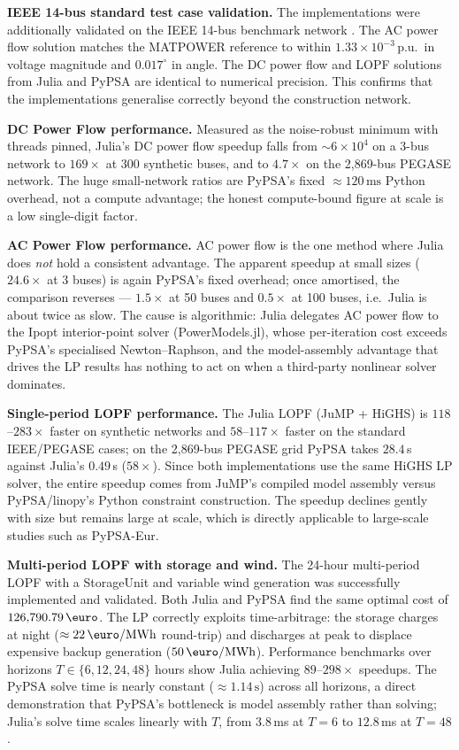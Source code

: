 \textbf{IEEE 14-bus standard test case validation.}
The implementations were additionally validated on the IEEE 14-bus benchmark network \cite{zimmerman2011matpower}. The AC power flow solution matches the MATPOWER reference to within $1.33 \times 10^{-3}$\,p.u.\ in voltage magnitude and $0.017^{\circ}$ in angle. The DC power flow and LOPF solutions from Julia and PyPSA are identical to numerical precision. This confirms that the implementations generalise correctly beyond the construction network.

\textbf{DC Power Flow performance.}
Measured as the noise-robust minimum with threads pinned, Julia's DC power flow speedup falls from $\sim$$6\times10^{4}$ on a 3-bus network to $169\times$ at 300 synthetic buses, and to $4.7\times$ on the 2{,}869-bus PEGASE network. The huge small-network ratios are PyPSA's fixed $\approx 120\,\text{ms}$ Python overhead, not a compute advantage; the honest compute-bound figure at scale is a low single-digit factor.

\textbf{AC Power Flow performance.}
AC power flow is the one method where Julia does \emph{not} hold a consistent advantage. The apparent speedup at small sizes ($24.6\times$ at 3 buses) is again PyPSA's fixed overhead; once amortised, the comparison reverses --- $1.5\times$ at 50 buses and $0.5\times$ at 100 buses, i.e.\ Julia is about twice as slow. The cause is algorithmic: Julia delegates AC power flow to the Ipopt interior-point solver (PowerModels.jl), whose per-iteration cost exceeds PyPSA's specialised Newton--Raphson, and the model-assembly advantage that drives the LP results has nothing to act on when a third-party nonlinear solver dominates.

\textbf{Single-period LOPF performance.}
The Julia LOPF (JuMP + HiGHS) is $118$--$283\times$ faster on synthetic networks and $58$--$117\times$ faster on the standard IEEE/PEGASE cases; on the 2{,}869-bus PEGASE grid PyPSA takes $28.4$\,s against Julia's $0.49$\,s ($58\times$). Since both implementations use the same HiGHS LP solver, the entire speedup comes from JuMP's compiled model assembly versus PyPSA/linopy's Python constraint construction. The speedup declines gently with size but remains large at scale, which is directly applicable to large-scale studies such as PyPSA-Eur.

\textbf{Multi-period LOPF with storage and wind.}
The 24-hour multi-period LOPF with a StorageUnit and variable wind generation was successfully implemented and validated. Both Julia and PyPSA find the same optimal cost of $126{,}790.79\,\text{\euro}$. The LP correctly exploits time-arbitrage: the storage charges at night ($\approx 22\,\text{\euro/MWh}$ round-trip) and discharges at peak to displace expensive backup generation ($50\,\text{\euro/MWh}$). Performance benchmarks over horizons $T \in \{6, 12, 24, 48\}$ hours show Julia achieving $89$--$298\times$ speedups. The PyPSA solve time is nearly constant ($\approx 1.14\,\text{s}$) across all horizons, a direct demonstration that PyPSA's bottleneck is model assembly rather than solving; Julia's solve time scales linearly with $T$, from $3.8$\,ms at $T = 6$ to $12.8$\,ms at $T = 48$.

